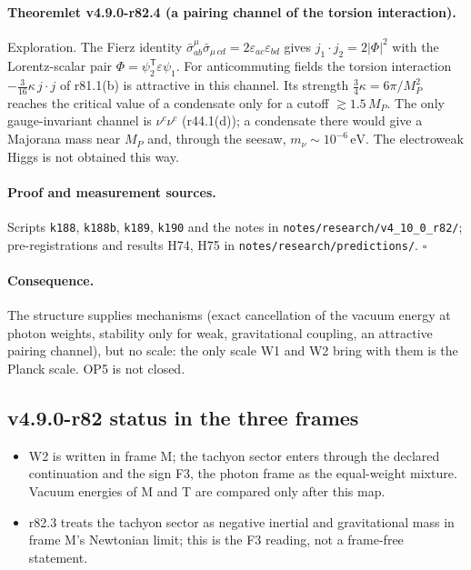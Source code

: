 \paragraph{Theoremlet v4.9.0-r82.4 (a pairing channel of the torsion interaction).}
Exploration.  The Fierz identity \(\bar\sigma^\mu_{ab}\bar\sigma_{\mu\,cd}=2\varepsilon_{ac}\varepsilon_{bd}\) gives
\(j_1\cdot j_2=2|\Phi|^2\) with the Lorentz-scalar pair \(\Phi=\psi_2^{\mathsf T}\varepsilon\psi_1\).  For anticommuting fields the
torsion interaction \(-\tfrac3{16}\kappa\,j\cdot j\) of r81.1(b) is attractive in this channel.  Its strength \(\tfrac34\kappa=6\pi/M_P^2\)
reaches the critical value of a condensate only for a cutoff \(\gtrsim1.5\,M_P\).  The only gauge-invariant channel is \(\nu^c\nu^c\)
(r44.1(d)); a condensate there would give a Majorana mass near \(M_P\) and, through the seesaw, \(m_\nu\sim10^{-6}\,\mathrm{eV}\).  The
electroweak Higgs is not obtained this way.

\paragraph{Proof and measurement sources.}
Scripts \texttt{k188}, \texttt{k188b}, \texttt{k189}, \texttt{k190} and the notes in \texttt{notes/\allowbreak research/\allowbreak v4\_10\_0\_r82/};
pre-registrations and results H74, H75 in \texttt{notes/\allowbreak research/\allowbreak predictions/}.  \(\square\)

\paragraph{Consequence.}
The structure supplies mechanisms (exact cancellation of the vacuum energy at photon weights, stability only for weak, gravitational
coupling, an attractive pairing channel), but no scale: the only scale W1 and W2 bring with them is the Planck scale.  OP5 is not
closed.

\subsection*{v4.9.0-r82 status in the three frames}
\label{subsec:v490-r82-frames}

\begin{itemize}[leftmargin=2em]
\item W2 is written in frame M; the tachyon sector enters through the declared continuation and the sign F3, the photon frame as the
equal-weight mixture.  Vacuum energies of M and T are compared only after this map.
\item r82.3 treats the tachyon sector as negative inertial and gravitational mass in frame M's Newtonian limit; this is the F3 reading,
not a frame-free statement.
\end{itemize}

